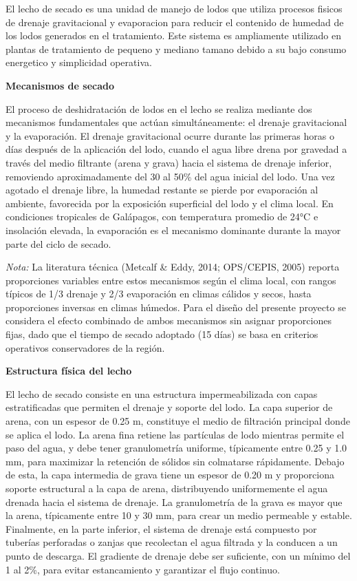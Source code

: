 

El lecho de secado es una unidad de manejo de lodos que utiliza procesos fisicos de drenaje gravitacional y evaporacion para reducir el contenido de humedad de los lodos generados en el tratamiento. Este sistema es ampliamente utilizado en plantas de tratamiento de pequeno y mediano tamano debido a su bajo consumo energetico y simplicidad operativa.

\textbf{Mecanismos de secado}

El proceso de deshidratación de lodos en el lecho se realiza mediante dos mecanismos fundamentales que actúan simultáneamente: el drenaje gravitacional y la evaporación. El drenaje gravitacional ocurre durante las primeras horas o días después de la aplicación del lodo, cuando el agua libre drena por gravedad a través del medio filtrante (arena y grava) hacia el sistema de drenaje inferior, removiendo aproximadamente del 30 al 50\% del agua inicial del lodo. Una vez agotado el drenaje libre, la humedad restante se pierde por evaporación al ambiente, favorecida por la exposición superficial del lodo y el clima local. En condiciones tropicales de Galápagos, con temperatura promedio de 24°C e insolación elevada, la evaporación es el mecanismo dominante durante la mayor parte del ciclo de secado.

\textit{Nota:} La literatura técnica (Metcalf \& Eddy, 2014; OPS/CEPIS, 2005) reporta proporciones variables entre estos mecanismos según el clima local, con rangos típicos de 1/3 drenaje y 2/3 evaporación en climas cálidos y secos, hasta proporciones inversas en climas húmedos. Para el diseño del presente proyecto se considera el efecto combinado de ambos mecanismos sin asignar proporciones fijas, dado que el tiempo de secado adoptado (15 días) se basa en criterios operativos conservadores de la región.

\textbf{Estructura física del lecho}

El lecho de secado consiste en una estructura impermeabilizada con capas estratificadas que permiten el drenaje y soporte del lodo. La capa superior de arena, con un espesor de 0.25 m, constituye el medio de filtración principal donde se aplica el lodo. La arena fina retiene las partículas de lodo mientras permite el paso del agua, y debe tener granulometría uniforme, típicamente entre 0.25 y 1.0 mm, para maximizar la retención de sólidos sin colmatarse rápidamente. Debajo de esta, la capa intermedia de grava tiene un espesor de 0.20 m y proporciona soporte estructural a la capa de arena, distribuyendo uniformemente el agua drenada hacia el sistema de drenaje. La granulometría de la grava es mayor que la arena, típicamente entre 10 y 30 mm, para crear un medio permeable y estable. Finalmente, en la parte inferior, el sistema de drenaje está compuesto por tuberías perforadas o zanjas que recolectan el agua filtrada y la conducen a un punto de descarga. El gradiente de drenaje debe ser suficiente, con un mínimo del 1 al 2\%, para evitar estancamiento y garantizar el flujo continuo.

